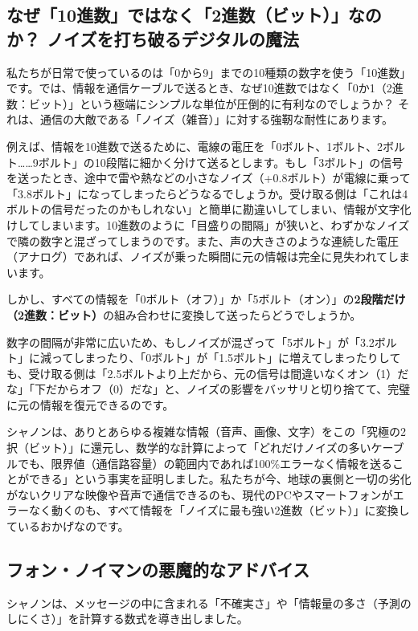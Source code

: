 \subsection{なぜ「10進数」ではなく「2進数（ビット）」なのか？ ノイズを打ち破るデジタルの魔法}

私たちが日常で使っているのは「0から9」までの10種類の数字を使う「10進数」です。では、情報を通信ケーブルで送るとき、なぜ10進数ではなく「0か1（2進数：ビット）」という極端にシンプルな単位が圧倒的に有利なのでしょうか？ それは、通信の大敵である「ノイズ（雑音）」に対する強靭な耐性にあります。

例えば、情報を10進数で送るために、電線の電圧を「0ボルト、1ボルト、2ボルト\ldots{}\ldots{}9ボルト」の10段階に細かく分けて送るとします。もし「3ボルト」の信号を送ったとき、途中で雷や熱などの小さなノイズ（+0.8ボルト）が電線に乗って「3.8ボルト」になってしまったらどうなるでしょうか。受け取る側は「これは4ボルトの信号だったのかもしれない」と簡単に勘違いしてしまい、情報が文字化けしてしまいます。10進数のように「目盛りの間隔」が狭いと、わずかなノイズで隣の数字と混ざってしまうのです。また、声の大きさのような連続した電圧（アナログ）であれば、ノイズが乗った瞬間に元の情報は完全に見失われてしまいます。

しかし、すべての情報を「0ボルト（オフ）」か「5ボルト（オン）」の\textbf{2段階だけ（2進数：ビット）}の組み合わせに変換して送ったらどうでしょうか。

数字の間隔が非常に広いため、もしノイズが混ざって「5ボルト」が「3.2ボルト」に減ってしまったり、「0ボルト」が「1.5ボルト」に増えてしまったりしても、受け取る側は「2.5ボルトより上だから、元の信号は間違いなくオン（1）だな」「下だからオフ（0）だな」と、ノイズの影響をバッサリと切り捨てて、完璧に元の情報を復元できるのです。

シャノンは、ありとあらゆる複雑な情報（音声、画像、文字）をこの「究極の2択（ビット）」に還元し、数学的な計算によって「どれだけノイズの多いケーブルでも、限界値（通信路容量）の範囲内であれば100\%エラーなく情報を送ることができる」という事実を証明しました。私たちが今、地球の裏側と一切の劣化がないクリアな映像や音声で通信できるのも、現代のPCやスマートフォンがエラーなく動くのも、すべて情報を「ノイズに最も強い2進数（ビット）」に変換しているおかげなのです。

\subsection{フォン・ノイマンの悪魔的なアドバイス}

シャノンは、メッセージの中に含まれる「不確実さ」や「情報量の多さ（予測のしにくさ）」を計算する数式を導き出しました。

